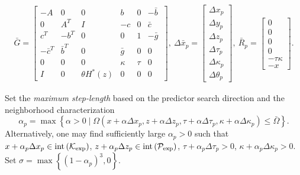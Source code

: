\documentclass[10pt]{article}
\theoremstyle{definition}
\theoremstyle{plain}
\def\interior{\protect{\textnormal{int}}}
\begin{document}
\begin{align}
\bar G = \begin{bmatrix}
-A & 0 & 0 & b & 0 & -\bar b\ \\
0 & A^T & I & -c & 0 & \bar c \\
c^T & -b^T & 0 & 0 & 1 & -\bar g \\
-\bar c^T & \bar b^T & 0 & \bar g & 0 & 0 \\
0 & 0 & 0 & \kappa & \tau & 0 \\
I & 0 & \theta H^*(z) & 0 & 0 & 0
\end{bmatrix},\ \Delta \bar{x}_p = \begin{bmatrix}
\Delta{x}_p\\ \Delta{y}_p\\ \Delta{z}_p\\ \Delta{\tau}_p\\ \Delta{\kappa}_p\\ \Delta{\theta}_p
\end{bmatrix},\ \bar R_p= \begin{bmatrix}
0 \\ 0 \\ 0 \\ 0 \\-\tau\kappa \\ -x
\end{bmatrix}. \label{G_bar_etc_predictor_system_def}
\end{align} 

Set the \textit{maximum step-length} based on the predictor search direction and the neighborhood characterization
\[\alpha_p = \max\left\{ \alpha >0 \mid \Omega(x+\alpha \Delta x_p, z+\alpha \Delta z_p, \tau + \alpha \Delta \tau_p, \kappa + \alpha \Delta \kappa_p) \leq \bar{\Omega} \right\}. \]
Alternatively, one may find sufficiently large $\alpha_p>0$ such that $x + \alpha_p \Delta x_p \in \interior \left(\mathcal{K}_{\exp}\right)$, $z + \alpha_p \Delta z_p \in \interior \left(\mathcal{P}_{\exp}\right)$, $\tau + \alpha_p \Delta \tau_p > 0$, $\kappa + \alpha_p \Delta \kappa_p > 0$. Set $\sigma = \max\left\{(1-\alpha_p)^3, 0\right\}$. \\
\end{document}
